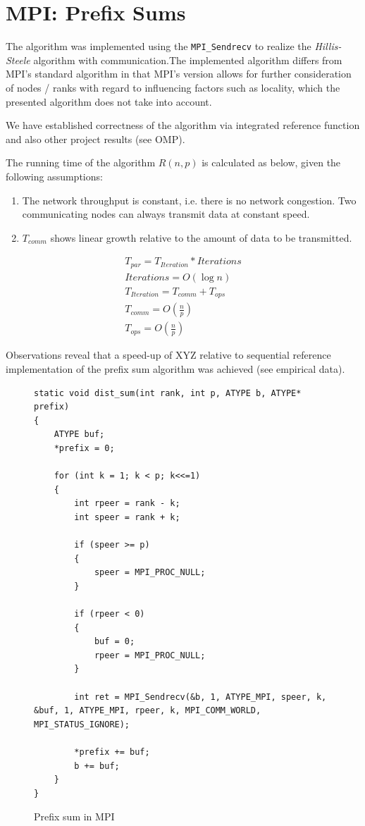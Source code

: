 \documentclass[11pt]{article}
\begin{document}
\newpage
\section{MPI: Prefix Sums}
The algorithm was implemented using the \verb=MPI_Sendrecv= to realize the \emph{Hillis-Steele} algorithm with communication.The implemented algorithm differs from MPI's standard algorithm in that MPI's version allows for further consideration of nodes / ranks with regard to influencing factors such as locality, which the presented algorithm does not take into account.

We have established correctness of the algorithm via integrated reference function and also other project results (see OMP).

The running time of the algorithm $R(n, p)$ is calculated as below, given the following assumptions:
\begin{enumerate}
\item The network throughput is constant, i.e. there is no network congestion. Two communicating nodes can always transmit data at constant speed.
\item $T_{comm}$ shows linear growth relative to the amount of data to be transmitted.
\end{enumerate}

\begin{eqnarray}
T_{par} = T_{Iteration} * Iterations\\
Iterations = O(\log n)\\
T_{Iteration} = T_{comm} + T_{ops}\\
T_{comm} = O\left(\frac{n}{p}\right)\\
T_{ops} = O\left(\frac{n}{p}\right)
\end{eqnarray}

Observations reveal that a speed-up of XYZ relative to sequential reference implementation of the prefix sum algorithm was achieved (see empirical data).

\begin{figure}[H]
\label{mpi_prefix_code}
\caption{Prefix sum in MPI}
\begin{lstlisting}
static void dist_sum(int rank, int p, ATYPE b, ATYPE* prefix)
{
	ATYPE buf;
	*prefix = 0;

	for (int k = 1; k < p; k<<=1) 
	{
		int rpeer = rank - k;
		int speer = rank + k;

		if (speer >= p)
		{
			speer = MPI_PROC_NULL;	
		}

		if (rpeer < 0)
		{
			buf = 0;
			rpeer = MPI_PROC_NULL;
		}

		int ret = MPI_Sendrecv(&b, 1, ATYPE_MPI, speer, k, &buf, 1, ATYPE_MPI, rpeer, k, MPI_COMM_WORLD, MPI_STATUS_IGNORE);
		
		*prefix += buf;
		b += buf;
	}
}
\end{lstlisting}

\end{figure}
\end{document}
